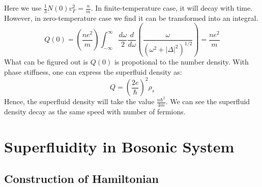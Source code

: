 \documentclass{article}
\begin{document}
Here we use $\frac{1}{3} N (0) v_F^2 = \frac{n}{m}$. In finite-temperature
case, it will decay with time. However, in zero-temperature case we find it
can be transformed into an integral.
\begin{equation}
  Q (0) = \left( \frac{n e^2}{m} \right) \int_{- \infty}^{\infty} \frac{d
  \omega}{2} \frac{d}{d \omega} \left( \frac{\omega}{(\omega^2 + | \Delta
  |^2)^{1 / 2}} \right) = \frac{n e^2}{m}
\end{equation}
What can be figured out is $Q (0)$ is propotional to the number density. With
phase stiffness, one can express the superfluid density as:
\begin{equation}
  Q = \left( \frac{2 e}{\hbar} \right)^2 \rho_s
\end{equation}
Hence, the superfluid density will take the value $\frac{n \hbar^2}{4 m}$. We
can see the superfluid density decay as the same speed with number of
fermions.

\section{Superfluidity in Bosonic System}

\subsection{Construction of Hamiltonian}
\end{document}
